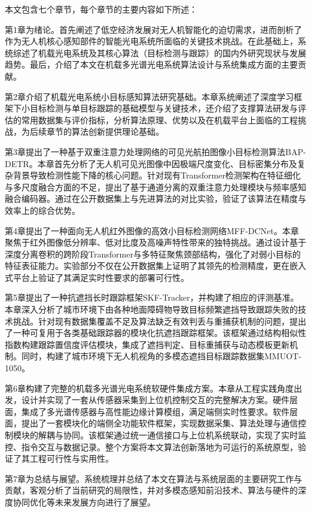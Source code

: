 本文包含七个章节，每个章节的主要内容如下所述：

第1章为绪论。首先阐述了低空经济发展对无人机智能化的迫切需求，进而剖析了作为无人机核心感知部件的智能光电系统所面临的关键技术挑战。在此基础上，系统综述了机载光电系统及其核心算法（目标检测与跟踪）的国内外研究现状与发展趋势。最后，介绍了本文在机载多光谱光电系统算法设计与系统集成方面的主要贡献。

第2章介绍了机载光电系统小目标感知算法研究基础。本章系统阐述了深度学习框架下小目标检测与单目标跟踪的基础模型与关键技术，还介绍了支撑算法研发与评估的常用数据集与评价指标，分析算法原理、优势以及在机载平台上面临的工程挑战，为后续章节的算法创新提供理论基础。

第3章提出了一种基于双重注意力处理网络的可见光航拍图像小目标检测算法BAP-DETR。本章首先分析了无人机可见光图像中因极端尺度变化、目标密集分布及复杂背景导致检测性能下降的核心问题。针对现有Transformer检测架构在特征细化与多尺度融合方面的不足，提出了基于通道分离的双重注意力处理模块与频率感知融合编码器。通过在公开数据集上与先进算法的对比实验，验证了该算法在精度与效率上的综合优势。

第4章提出了一种面向无人机红外图像的高效小目标检测网络MFF-DCNet。本章聚焦于红外图像低分辨率、低对比度及高噪声特性带来的独特挑战。通过设计基于深度分离卷积的跨阶段Transformer与多特征聚焦颈部结构，强化了对弱小目标的特征表征能力。实验部分不仅在公开数据集上证明了其领先的检测精度，更在嵌入式平台上验证了其满足实时性要求的部署可行性。

第5章提出了一种抗遮挡长时跟踪框架SKF-Tracker，并构建了相应的评测基准。本章深入分析了城市环境下由各种地面障碍物导致目标频繁遮挡导致跟踪失败的技术挑战。针对现有数据集覆盖不足及算法缺乏有效判丢与重捕获机制的问题，提出了一种可复用于各类基础跟踪器的模块化抗遮挡跟踪框架。该框架通过结构相似性指数构建跟踪置信度评估模块，集成了遮挡判定、目标重捕获与动态模板更新机制。同时，构建了城市环境下无人机视角的多模态遮挡目标跟踪数据集MMUOT-1050。

第6章构建了完整的机载多光谱光电系统软硬件集成方案。本章从工程实践角度出发，设计并实现了一套从传感器采集到上位机控制交互的完整解决方案。硬件层面，集成了多光谱传感器与高性能边缘计算模组，满足端侧实时性要求。软件层面，提出了一套模块化的端侧全功能软件框架，实现数据采集、算法处理与通信控制模块的解耦与协同。该框架通过统一通信接口与上位机系统联动，实现了实时监控、指令交互与数据记录。整个方案将本文算法创新落地为可运行的系统原型，验证了其工程可行性与实用性。

第7章为总结与展望。系统梳理并总结了本文在算法与系统层面的主要研究工作与贡献，客观分析了当前研究的局限性，并对多模态感知前沿技术、算法与硬件的深度协同优化等未来发展方向进行了展望。

